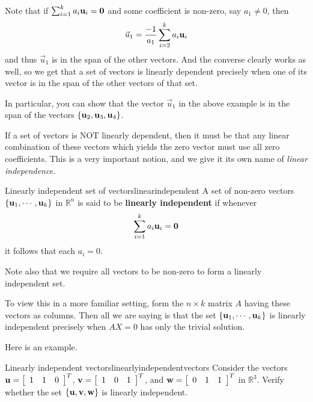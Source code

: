 Note that if $\sum_{i=1}^{k}a_{i}{\bf u}_{i}={\bf 0}$ and some
coefficient is non-zero, say $a_1 \neq 0$, then 
\begin{equation*}
\vec{u}_1 = \frac{-1}{a_1} \sum_{i=2}^{k}a_{i}{\bf u}_{i} 
\end{equation*}
and thus $\vec{u}_1$ is in the span of the other vectors. And the converse clearly works as well,
so we get that a set of vectors is linearly dependent precisely when
one of its vector is in the span of the other vectors of that set.

In particular, you can show that the vector $\vec{u}_1$ in the above
example is in the span of the vectors  $\{ {\bf u}_2, {\bf u}_3, {\bf u}_4 \}$. 

If a set of vectors is NOT linearly dependent, then it must be that
any linear combination of these vectors which yields the zero vector
must use all zero coefficients. This is a very important notion, and we give it its own name of {\em
linear independence}. 

\begin{definition}{Linearly independent set of vectors}{linearindependent}
A set of non-zero vectors $\{ {\bf u}_1, \cdots ,{\bf u}_k\}$ in $\mathbb{R}^{n}$ is said to be 
\textbf{linearly independent} if whenever 
\begin{equation*}
\sum_{i=1}^{k}a_{i}{\bf u}_{i}={\bf 0}
\end{equation*}
it follows that each $a_{i}=0$.
\end{definition}


Note also that we require all vectors to be non-zero to form a
linearly independent set.

To view this in a more familiar setting, form the $n \times k$ matrix
$A$ having these vectors as columns. Then all we are saying is that
the set $\{ {\bf u}_1, \cdots ,{\bf u}_k\}$ is linearly independent
precisely when $AX=0$ has only the trivial solution.

Here is an example.  

\begin{example}{Linearly independent vectors}{linearlyindependentvectors}
Consider the vectors ${\bf u}=\left[ 
\begin{array}{rrr}
1  & 1 & 0
\end{array}
\right]^T$, 
${\bf v}=\left[ 
\begin{array}{rrr}
1  & 0 & 1
\end{array}
\right]^T$, and
${\bf w}=\left[ 
\begin{array}{rrr}
0  & 1 & 1
\end{array}
\right]^T$ in $\mathbb{R}^{3}$.
Verify whether the set $\{{\bf u}, {\bf v}, {\bf w}\}$ is linearly independent. 
\end{example}

